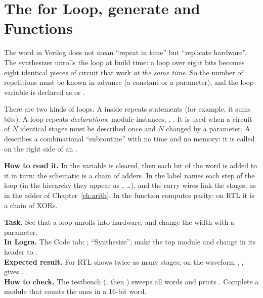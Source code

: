 \section{The for Loop, generate and Functions}
\label{sec:v-loops}

The word  in Verilog does not mean ``repeat in time'' but
``replicate hardware''. The synthesizer unrolls the loop at build time: a loop
over eight bits becomes eight identical pieces of circuit that work
\emph{at the same time}. So the number of repetitions must be known in advance
(a constant or a parameter), and the loop variable is declared as
 or .

There are two kinds of loops. A  inside  repeats
statements (for example, it sums bits). A  loop repeats
\emph{declarations}: module instances, , . It is used
when a circuit of $N$ identical stages must be described once and $N$ changed
by a parameter. A  describes a combinational ``subroutine''
with no time and no memory: it is called on the right side of an .


\textbf{How to read it.} In  the variable  is cleared,
then each bit of the word is added to it in turn: the schematic is a chain of
adders. In  the label  names each step of the loop
(in the hierarchy they appear as , \ldots), and
the carry wires  link the stages, as in the adder of
Chapter~\ref{ch:arith}. In  the function computes parity: on
RTL it is a chain of XORs.

\begin{diybox}
\textbf{Task.} See that a loop unrolls into hardware, and change the width with a parameter.\\
\textbf{In Logra.} The Code tab: ; ``Synthesize''; make  the top module and change  in its header to .\\
\textbf{Expected result.} For  RTL shows twice as many stages; on the waveform , ,  gives .\\
\textbf{How to check.} The testbench  (, then ) sweeps all words and prints .
 Complete a module that counts the ones in a 16-bit word.
\end{diybox}

